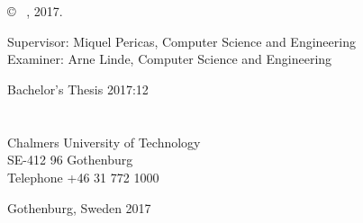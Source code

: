 \newpage
\thispagestyle{plain}
\vspace*{4.5cm}
\varHeadline \\
\varSubtitle \\
\varNames \setlength{\parskip}{1cm}

\copyright ~ \varNames, 2017. \setlength{\parskip}{1cm}

Supervisor: Miquel Pericas, Computer Science and Engineering\\
Examiner: Arne Linde, Computer Science and Engineering \setlength{\parskip}{1cm}

Bachelor's Thesis 2017:12\\	%
\varDepartment \\
\varResearchGroupName\\
Chalmers University of Technology\\
SE-412 96 Gothenburg\\
Telephone +46 31 772 1000 \setlength{\parskip}{0.5cm}

\vfill
Gothenburg, Sweden 2017

\setlength{\parindent}{1cm}                         
